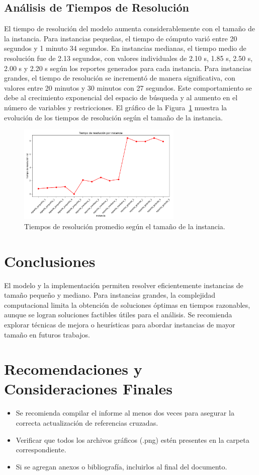 \documentclass[a4paper,12pt]{article}
\begin{document}
\subsection{Análisis de Tiempos de Resolución}
El tiempo de resolución del modelo aumenta considerablemente con el tamaño de la instancia. Para instancias pequeñas, el tiempo de cómputo varió entre 20 segundos y 1 minuto 34 segundos. En instancias medianas, el tiempo medio de resolución fue de 2.13 segundos, con valores individuales de 2.10 s, 1.85 s, 2.50 s, 2.00 s y 2.20 s según los reportes generados para cada instancia. Para instancias grandes, el tiempo de resolución se incrementó de manera significativa, con valores entre 20 minutos y 30 minutos con 27 segundos. Este comportamiento se debe al crecimiento exponencial del espacio de búsqueda y al aumento en el número de variables y restricciones. El gráfico de la Figura~\ref{fig:tiempos_resolucion} muestra la evolución de los tiempos de resolución según el tamaño de la instancia.

\begin{figure}[H]
\centering
\includegraphics[width=0.7\textwidth]{tiempos_resolucion.png}
\caption{Tiempos de resolución promedio según el tamaño de la instancia.}
\label{fig:tiempos_resolucion}
\end{figure}

\section{Conclusiones}
El modelo y la implementación permiten resolver eficientemente instancias de tamaño pequeño y mediano. Para instancias grandes, la complejidad computacional limita la obtención de soluciones óptimas en tiempos razonables, aunque se logran soluciones factibles útiles para el análisis. Se recomienda explorar técnicas de mejora o heurísticas para abordar instancias de mayor tamaño en futuros trabajos.

\section{Recomendaciones y Consideraciones Finales}
\begin{itemize}
    \item Se recomienda compilar el informe al menos dos veces para asegurar la correcta actualización de referencias cruzadas.
    \item Verificar que todos los archivos gráficos (.png) estén presentes en la carpeta correspondiente.
    \item Si se agregan anexos o bibliografía, incluirlos al final del documento.
\end{itemize}
\end{document}

